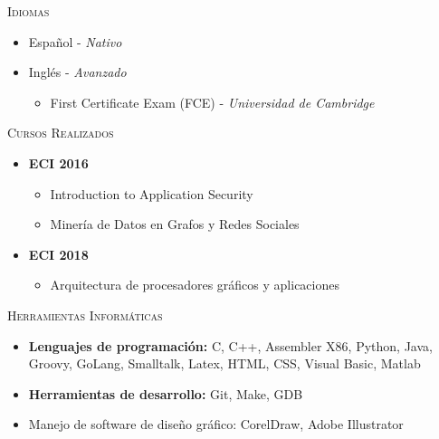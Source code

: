 \textsc{Idiomas}
\begin{itemize}
    \item Español - \textit{Nativo}
    \item Inglés - \textit{Avanzado}
    \begin{itemize}
        \item First Certificate Exam (FCE) - \textit{Universidad de Cambridge}
    \end{itemize}
\end{itemize}

\textsc{Cursos Realizados}
\begin{itemize}
    \item \textbf{ECI 2016} 
        \begin{itemize}
            \item Introduction to Application Security
            \item Minería de Datos en Grafos y Redes Sociales
        \end{itemize}
    \item \textbf{ECI 2018} 
        \begin{itemize}
            \item Arquitectura de procesadores gráficos y aplicaciones
        \end{itemize}
\end{itemize}

\textsc{Herramientas Informáticas}
\begin{itemize}
    \item \textbf{Lenguajes de programación: } C, C++, Assembler X86, Python, Java, Groovy, GoLang, Smalltalk, Latex, HTML, CSS,
        Visual Basic, Matlab
    \item \textbf{Herramientas de desarrollo: } Git, Make, GDB
    \item Manejo de software de diseño gráfico: CorelDraw, Adobe Illustrator
\end{itemize}
